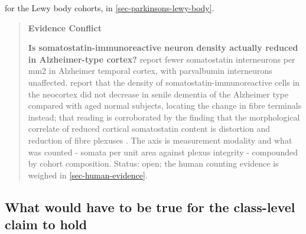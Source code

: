 \documentclass[11pt]{article}
\begin{document}
for the Lewy body cohorts, in \ref{sec-parkinsons-lewy-body}.

\begin{quote}
\noindent\textbf{Evidence Conflict}\par
\textbf{Is somatostatin-immunoreactive neuron density actually reduced in Alzheimer-type cortex?} \citet{Waller2020} report fewer somatostatin interneurons per mm2 in Alzheimer temporal cortex, with parvalbumin interneurons unaffected. \citet{Nakamura1986} report that the density of somatostatin-immunoreactive cells in the neocortex did not decrease in senile dementia of the Alzheimer type compared with aged normal subjects, locating the change in fibre terminals instead; that reading is corroborated by the finding that the morphological correlate of reduced cortical somatostatin content is distortion and reduction of fibre plexuses \citep{Kowall1988}. The axis is measurement modality and what was counted - somata per unit area against plexus integrity - compounded by cohort composition. Status: open; the human counting evidence is weighed in \ref{sec-human-evidence}.

\end{quote}

\subsection{What would have to be true for the class-level claim to hold}
\label{sec-03-testable}
\end{document}
